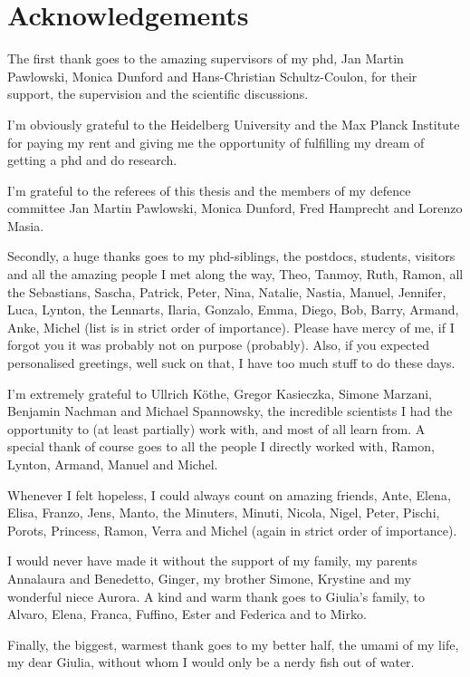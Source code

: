 \chapter{Acknowledgements}\label{chap:acknowledgements}
\enlargethispage{2ex}
\vspace*{-2pt}
\thispagestyle{empty}

The first thank goes to the amazing supervisors of my phd,  Jan Martin Pawlowski, Monica Dunford and Hans-Christian Schultz-Coulon, for their support, the supervision and the scientific discussions.

\medskip

I'm obviously grateful to the Heidelberg University and the Max Planck Institute for paying my rent and giving me the opportunity of fulfilling my dream of getting a phd and do research.

\medskip

I'm grateful to the referees of this thesis and the members of my defence committee Jan Martin Pawlowski, Monica Dunford, Fred Hamprecht and Lorenzo Masia.

\medskip

Secondly, a huge thanks goes to my phd-siblings, the postdocs, students, visitors and all the amazing people I met along the way, Theo, Tanmoy, Ruth, Ramon, all the Sebastians, Sascha, Patrick, Peter, Nina, Natalie, Nastia, Manuel, Jennifer, Luca, Lynton, the Lennarts, Ilaria, Gonzalo, Emma, Diego, Bob, Barry, Armand, Anke, Michel (list is in strict order of importance). Please have mercy of me, if I forgot you it was probably not on purpose (probably). Also, if you expected personalised greetings, well suck on that, I have too much stuff to do these days.

\medskip

I'm extremely grateful to Ullrich Köthe, Gregor Kasieczka, Simone Marzani, Benjamin Nachman and Michael Spannowsky, the incredible scientists I had the opportunity to (at least partially) work with, and most of all learn from. A special thank of course goes to all the people I directly worked with, Ramon, Lynton, Armand, Manuel and Michel.


\medskip

Whenever I felt hopeless, I could always count on amazing friends, Ante, Elena, Elisa, Franzo, Jens, Manto, the Minuters, Minuti, Nicola, Nigel, Peter, Pischi, Porots, Princess, Ramon, Verra and Michel (again in strict order of importance).

\medskip

I would never have made it without the support of my family, my parents Annalaura and Benedetto, Ginger, my brother Simone, Krystine and my wonderful niece Aurora. A kind and warm thank goes to Giulia's family, to Alvaro, Elena, Franca, Fuffino, Ester and Federica and to Mirko.

\medskip

Finally, the biggest, warmest thank goes to my better half, the umami of my life, my dear Giulia, without whom I would only be a nerdy fish out of water.

